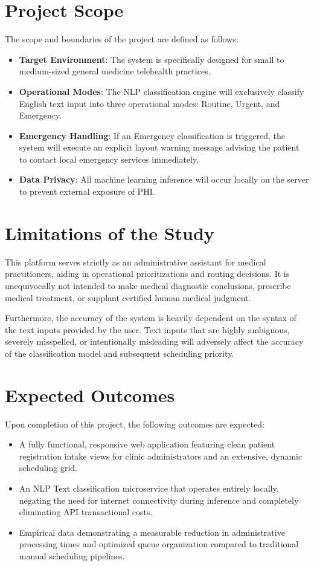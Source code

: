 \documentclass[12pt,a4paper]{report}
\begin{document}
\section{Project Scope}
The scope and boundaries of the project are defined as follows:
\begin{itemize}
    \item \textbf{Target Environment}: The system is specifically designed for small to medium-sized general medicine telehealth practices.
    \item \textbf{Operational Modes}: The NLP classification engine will exclusively classify English text input into three operational modes: Routine, Urgent, and Emergency. 
    \item \textbf{Emergency Handling}: If an Emergency classification is triggered, the system will execute an explicit layout warning message advising the patient to contact local emergency services immediately.
    \item \textbf{Data Privacy}: All machine learning inference will occur locally on the server to prevent external exposure of PHI.
\end{itemize}

\section{Limitations of the Study}
This platform serves strictly as an administrative assistant for medical practitioners, aiding in operational prioritizations and routing decisions. It is unequivocally not intended to make medical diagnostic conclusions, prescribe medical treatment, or supplant certified human medical judgment. 

Furthermore, the accuracy of the system is heavily dependent on the syntax of the text inputs provided by the user. Text inputs that are highly ambiguous, severely misspelled, or intentionally misleading will adversely affect the accuracy of the classification model and subsequent scheduling priority.

\section{Expected Outcomes}
Upon completion of this project, the following outcomes are expected:
\begin{itemize}
    \item A fully functional, responsive web application featuring clean patient registration intake views for clinic administrators and an extensive, dynamic scheduling grid.
    \item An NLP Text classification microservice that operates entirely locally, negating the need for internet connectivity during inference and completely eliminating API transactional costs.
    \item Empirical data demonstrating a measurable reduction in administrative processing times and optimized queue organization compared to traditional manual scheduling pipelines.
\end{itemize}
\end{document}
